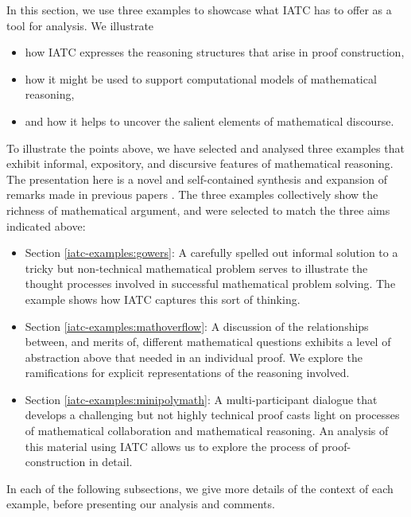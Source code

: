 \documentclass[smallextended,oneside]{svjour3}       %
\let\cite\citep
\newcommand\nothing[1]{#1}
\let\thesis\nothing
\begin{document}
\thesis{In this section, we use three examples to showcase what IATC has to offer as a tool for analysis.}
We illustrate
\begin{itemize}
\item how IATC expresses the reasoning structures that arise in proof construction,
\item how it might be used to support computational models of mathematical reasoning,
\item and how it helps to uncover the salient elements of mathematical discourse.
\end{itemize}
To illustrate the points above, we have selected and analysed three examples
that exhibit informal, expository, and discursive features of mathematical reasoning.
The presentation here is a novel and self-contained synthesis and expansion of
remarks made in previous papers
\cite{corneli2017towards,corneli2017modelling,pease-and-martin}.
The three examples collectively show the richness of mathematical argument, and were selected
to match the three aims indicated above:
\begin{itemize}
\item Section \ref{iatc-examples:gowers}: A carefully spelled out informal solution to a tricky but non-technical mathematical problem serves to  illustrate the thought processes involved in successful mathematical problem solving.  The example shows how IATC captures this sort of thinking.
\item Section \ref{iatc-examples:mathoverflow}: A discussion of the relationships between, and merits of, different mathematical questions exhibits a level of abstraction above that needed in an individual proof.  We explore the ramifications for explicit representations of the reasoning involved.
\item Section \ref{iatc-examples:minipolymath}: A multi-participant dialogue that develops a challenging but not highly technical proof  casts light on processes of mathematical collaboration and mathematical reasoning.  An analysis of this material using IATC allows us to explore the process of proof-construction in detail.
\end{itemize}
In each of the following subsections, we give more details of the
context of each example, before presenting our analysis and comments.
\end{document}
